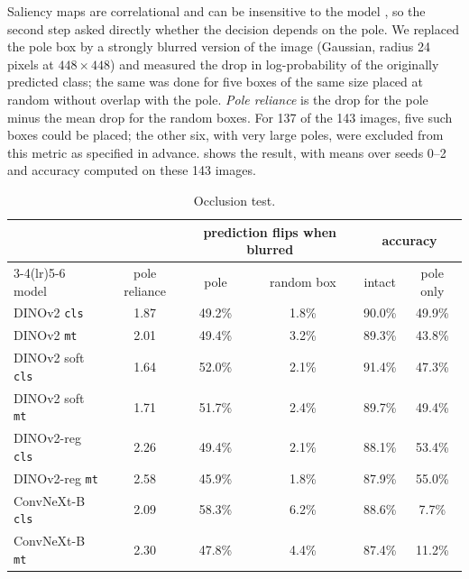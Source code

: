 \documentclass[11pt]{article}
\newcommand{\cls}{\texttt{cls}}
\newcommand{\mt}{\texttt{mt}}
\begin{document}
Saliency maps are correlational and can be insensitive to the model \citep{adebayo2018sanity}, so the second
step asked directly whether the decision depends on the pole. We replaced the pole box by a strongly blurred
version of the image (Gaussian, radius 24 pixels at $448 \times 448$) and measured the drop in log-probability
of the originally predicted class; the same was done for five boxes of the same size placed at random without
overlap with the pole. \emph{Pole reliance} is the drop for the pole minus the mean drop for the random boxes.
For 137 of the 143 images, five such boxes could be placed; the other six, with very large poles, were excluded
from this metric as specified in advance.  shows the result, with means over seeds 0--2 and
accuracy computed on these 143 images.

\begin{table}[!htb]
\centering
\caption{Occlusion test.}
\label{tab:occlusion}
\small
\begin{tabular}{lccccc}
\toprule
 & & \multicolumn{2}{c}{prediction flips when blurred} & \multicolumn{2}{c}{accuracy} \\
\cmidrule(lr){3-4}\cmidrule(lr){5-6}
model & pole reliance & pole & random box & intact & pole only \\
\midrule
DINOv2 \cls{}       & 1.87 & 49.2\% & 1.8\% & 90.0\% & 49.9\% \\
DINOv2 \mt{}        & 2.01 & 49.4\% & 3.2\% & 89.3\% & 43.8\% \\
DINOv2 soft \cls{}  & 1.64 & 52.0\% & 2.1\% & 91.4\% & 47.3\% \\
DINOv2 soft \mt{}   & 1.71 & 51.7\% & 2.4\% & 89.7\% & 49.4\% \\
DINOv2-reg \cls{}   & 2.26 & 49.4\% & 2.1\% & 88.1\% & 53.4\% \\
DINOv2-reg \mt{}    & 2.58 & 45.9\% & 1.8\% & 87.9\% & 55.0\% \\
\addlinespace
ConvNeXt-B \cls{}   & 2.09 & 58.3\% & 6.2\% & 88.6\% & 7.7\% \\
ConvNeXt-B \mt{}    & 2.30 & 47.8\% & 4.4\% & 87.4\% & 11.2\% \\
\bottomrule
\end{tabular}
\end{table}
\end{document}
